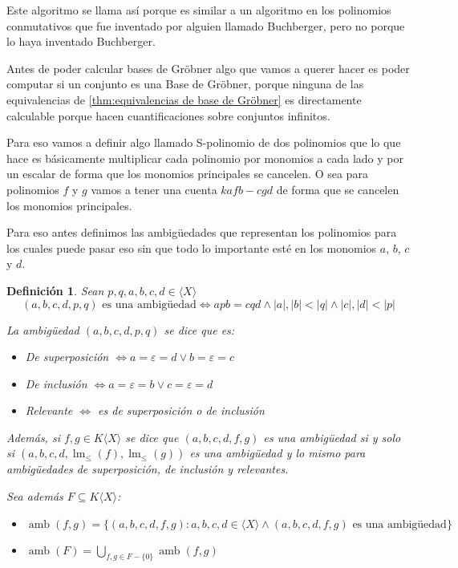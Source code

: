 \documentclass[12pt]{report}
\theoremstyle{customstyle}
\newtheorem{definition}{Definición}[chapter]
\theoremstyle{factstyle}
\DeclareMathOperator{\lm}{lm}
\DeclareMathOperator{\amb}{amb}
\begin{document}
Este algoritmo se llama así porque es similar a un algoritmo en los polinomios conmutativos que fue inventado por alguien llamado Buchberger, pero no porque lo haya inventado Buchberger.

Antes de poder calcular bases de Gröbner algo que vamos a querer hacer es poder computar si un conjunto es una Base de Gröbner, porque ninguna de las equivalencias de \cref{thm:equivalencias de base de Gröbner} es directamente calculable porque hacen cuantificaciones sobre conjuntos infinitos.

Para eso vamos a definir algo llamado S-polinomio de dos polinomios que lo que hace es básicamente multiplicar cada polinomio por monomios a cada lado y por un escalar de forma que los monomios principales se cancelen. O sea para polinomios $f$ y $g$ vamos a tener una cuenta $k a f b - c g d$ de forma que se cancelen los monomios principales.

Para eso antes definimos las ambigüedades que representan los polinomios para los cuales puede pasar eso sin que todo lo importante esté en los monomios $a$, $b$, $c$ y $d$.

\begin{definition}
  Sean $p, q, a, b, c, d ∈ ⟨X⟩$
  \[ (a, b, c, d, p, q)\text{ es una ambigüedad} ⇔ apb = cqd ∧ |a|, |b| < |q| ∧ |c|, |d| < |p| \]

  La ambigüedad $(a, b, c, d, p, q)$ se dice que es:
  \begin{itemize}
    \item De superposición $⇔ a = ε = d ∨ b = ε = c$
    \item De inclusión $⇔ a = ε = b ∨ c = ε = d$
    \item Relevante $⇔$ es de superposición o de inclusión
  \end{itemize}

  Además, si $f, g ∈ K⟨X⟩$ se dice que $(a, b, c, d, f, g)$ es una ambigüedad si y solo si $(a, b, c, d, \lm_≤{(f)}, \lm_≤{(g)})$ es una ambigüedad y lo mismo para ambigüedades de superposición, de inclusión y relevantes.

  Sea además $F ⊆ K⟨X⟩$:
  \begin{itemize}
    \item $\amb(f, g) = \{(a, b, c, d, f, g) : a, b, c, d ∈ ⟨X⟩ ∧ (a, b, c, d, f, g)\text{ es una ambigüedad}\}$
    \item $\amb(F) = ⋃_{f, g ∈ F - \{0\}}{\amb(f, g)}$
  \end{itemize}

\end{definition}
\end{document}
